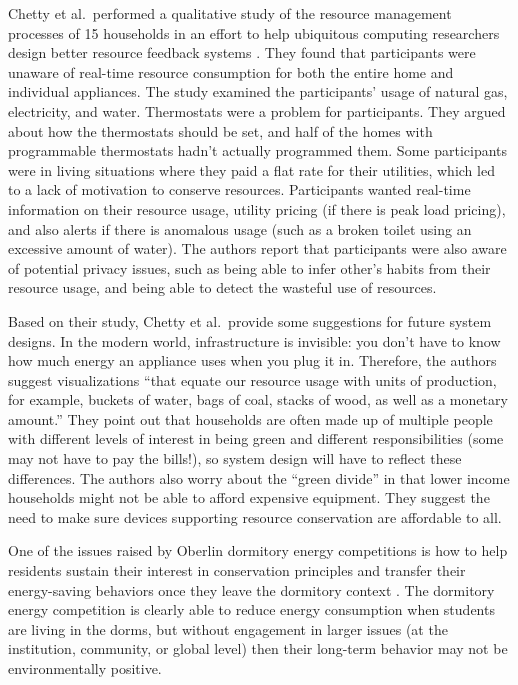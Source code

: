 Chetty et al.\ performed a qualitative study of the resource management processes of 15 households in an effort to help ubiquitous computing researchers design better resource feedback systems \cite{chetty-2008}. They found that participants were unaware of real-time resource consumption for both the entire home and individual appliances. The study examined the participants' usage of natural gas, electricity, and water. Thermostats were a problem for participants. They argued about how the thermostats should be set, and half of the homes with programmable thermostats hadn't actually programmed them. Some participants were in living situations where they paid a flat rate for their utilities, which led to a lack of motivation to conserve resources. Participants wanted real-time information on their resource usage, utility pricing (if there is peak load pricing), and also alerts if there is anomalous usage (such as a broken toilet using an excessive amount of water). The authors report that participants were also aware of potential privacy issues, such as being able to infer other's habits from their resource usage, and being able to detect the wasteful use of resources.

Based on their study, Chetty et al.\ provide some suggestions for future system designs. In the modern world, infrastructure is invisible: you don't have to know how much energy an appliance uses when you plug it in. Therefore, the authors suggest visualizations ``that equate our resource usage with units of production, for example, buckets of water, bags of coal, stacks of wood, as well as a monetary amount.'' They point out that households are often made up of multiple people with different levels of interest in being green and different responsibilities (some may not have to pay the bills!), so system design will have to reflect these differences. The authors also worry about the ``green divide'' in that lower income households might not be able to afford expensive equipment. They suggest the need to make sure devices supporting resource conservation are affordable to all.

One of the issues raised by Oberlin dormitory energy competitions is how to help residents sustain their interest in conservation principles and transfer their energy-saving behaviors once they leave the dormitory context \cite{Petersen09}. The dormitory energy competition is clearly able to reduce energy consumption when students are living in the dorms, but without engagement in larger issues (at the institution, community, or global level) then their long-term behavior may not be environmentally positive.


